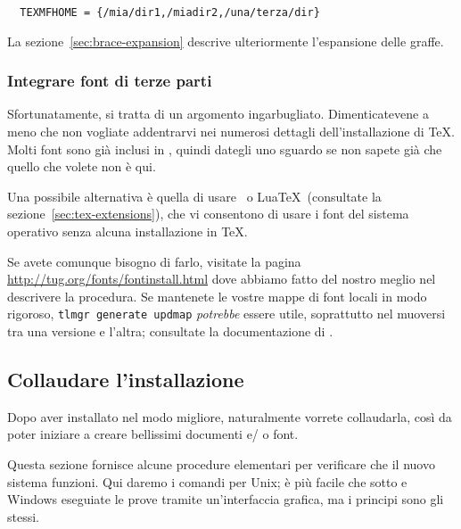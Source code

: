 \documentclass{article}
\begin{document}
\begin{verbatim}
  TEXMFHOME = {/mia/dir1,/miadir2,/una/terza/dir}
\end{verbatim}

La sezione~\ref{sec:brace-expansion} descrive ulteriormente l'espansione
delle graffe.


\subsubsection{Integrare font di terze parti}

Sfortunatamente, si tratta di un argomento ingarbugliato. Dimenticatevene
a meno che non vogliate addentrarvi nei numerosi dettagli
dell'installazione di \TeX{}. Molti font sono già inclusi in \TL, quindi
dategli uno sguardo se non sapete già che quello che volete non è qui.

Una possibile alternativa è quella di usare \XeTeX\ o Lua\TeX\ (consultate
la sezione~\ref{sec:tex-extensions}), che vi consentono di usare i font
del sistema operativo senza alcuna installazione in \TeX.

Se avete comunque bisogno di farlo, visitate la pagina
\url{http://tug.org/fonts/fontinstall.html} dove abbiamo fatto del nostro
meglio nel descrivere la procedura. Se mantenete le vostre mappe di font
locali in modo rigoroso, \texttt{tlmgr generate updmap} \textit{potrebbe}
essere utile, soprattutto nel muoversi tra una versione e l'altra;
consultate la documentazione di .


\subsection{Collaudare l'installazione}
\label{sec:test-install}

Dopo aver installato \TL{} nel modo migliore, naturalmente vorrete
collaudarla, così da poter iniziare a creare bellissimi documenti e\slash
o font.

Questa sezione fornisce alcune procedure elementari per verificare che il
nuovo sistema funzioni. Qui daremo i comandi per Unix; è più facile che
sotto \MacOSX e Windows eseguiate le prove tramite un'interfaccia grafica,
ma i principi sono gli stessi.
\end{document}
